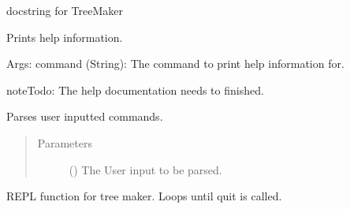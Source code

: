 \documentclass[letterpaper,10pt,english]{sphinxmanual}
\begin{document}
\begin{fulllineitems}
\label{\detokenize{index:TreeMaker.TreeMaker}}
docstring for TreeMaker

\begin{fulllineitems}
\label{\detokenize{index:TreeMaker.TreeMaker.help}}
Prints help information.

Args:
command (String): The command to print help information for.

\begin{sphinxadmonition}{note}{Todo:}
The help documentation needs to finished.
\end{sphinxadmonition}

\end{fulllineitems}


\begin{fulllineitems}
\label{\detokenize{index:TreeMaker.TreeMaker.parse}}
Parses user inputted commands.
\begin{quote}\begin{description}
\item[{Parameters}] \leavevmode
{} () \textendash{} The User input to be parsed.

\end{description}\end{quote}

\end{fulllineitems}


\begin{fulllineitems}
\label{\detokenize{index:TreeMaker.TreeMaker.repl}}
REPL function for tree maker. Loops until quit is called.

\end{fulllineitems}


\end{fulllineitems}

\label{\detokenize{index:module-VoteSession}}
\end{document}
